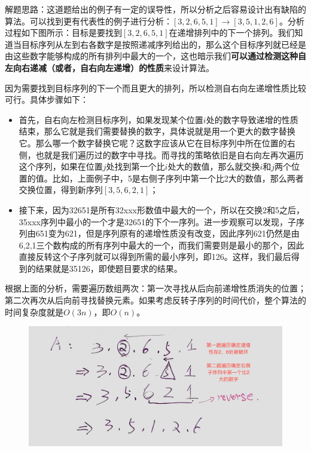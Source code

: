 \documentclass[a4paper,10pt]{article}
\begin{document}
\begin{CJK*}{UTF8}{gbsn}
\noindent 解题思路：这道题给出的例子有一定的误导性，所以分析之后容易设计出有缺陷的算法。可以找到更有代表性的例子进行分析：$[3,2,6,5,1] \to [3,5,1,2,6]$。分析过程如下图所示：目标是要找到$[3,2,6,5,1]$在递增排列中的下一个排列。我们知道当目标序列从左到右各数字是按照递减序列给出的，那么这个目标序列就已经是由这些数字能够构成的所有排列中最大的一个，这也暗示我们\textbf{可以通过检测这种自左向右递减（或者，自右向左递增）的性质}来设计算法。

\noindent 因为需要找到目标序列的下一个而且更大的排列，所以检测自右向左递增性质比较可行。具体步骤如下：
\begin{itemize}
    \item 首先，自右向左检测目标序列，如果发现某个位置$i$处的数字导致递增的性质结束，那么它就是我们需要替换的数字，具体说就是用一个更大的数字替换它。那么哪一个数字替换它呢？这数字应该从它在目标序列中所在位置的右侧，也就是我们遍历过的数字中寻找。而寻找的策略依旧是自右向左再次遍历这个序列，如果在位置$j$处找到第一个比$i$处大的数值，那么就交换$i$和$j$两个位置的值。比如，上面例子中，5是右侧子序列中第一个比2大的数值，那么两者交换位置，得到新序列$[3,5,6,2,1]$；
    \item 接下来，因为32651是所有32xxx形数值中最大的一个，所以在交换2和5之后，35xxx序列中最小的一个才是32651的下个一序列。进一步观察可以发现，子序列由651变为621，但是序列原有的递增性质没有改变，因此序列621仍然是由6,2,1三个数构成的所有序列中最大的一个，而我们需要则是最小的那个，因此直接反转这个子序列就可以得到所需的最小序列，即126。这样，我们最后得到的结果就是35126，即使题目要求的结果。
\end{itemize}
\noindent 根据上面的分析，需要遍历数组两次：第一次寻找从后向前递增性质消失的位置；第二次再次从后向前寻找替换元素。如果考虑反转子序列的时间代价，整个算法的时间复杂度就是$O(3n)$，即$O(n)$。
\end{CJK*}

\begin{figure}[h]
    \includegraphics[width=\textwidth]{leetcode31.jpg}
    \centering \\
\end{figure}
\end{document}
